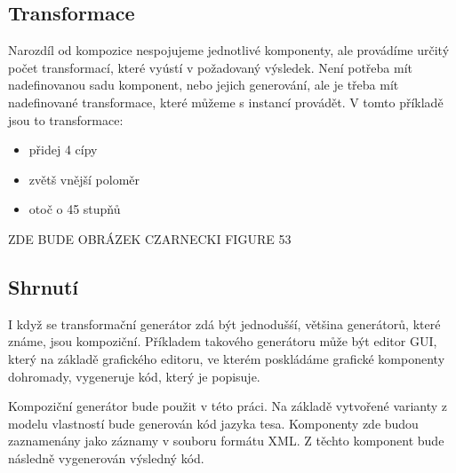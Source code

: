 \subsection{Transformace}
Narozdíl od kompozice nespojujeme jednotlivé komponenty, ale provádíme určitý počet transformací, které vyústí v požadovaný výsledek. Není potřeba mít nadefinovanou sadu komponent, nebo jejich generování, ale je třeba mít nadefinované transformace, které můžeme s instancí provádět. V tomto příkladě jsou to transformace: 
\begin{itemize}
	\item přidej 4 cípy
	\item zvětš vnější poloměr
	\item otoč o 45 stupňů
\end{itemize}
ZDE BUDE OBRÁZEK CZARNECKI FIGURE 53

\subsection{Shrnutí}
I když se transformační generátor zdá být jednodušśí, většina generátorů, které známe, jsou kompoziční. Příkladem takového generátoru může být editor GUI, který na základě grafického editoru, ve kterém poskládáme grafické komponenty dohromady, vygeneruje kód, který je popisuje.

Kompoziční generátor bude použit v této práci. Na základě vytvořené varianty z modelu vlastností bude generován kód jazyka tesa. Komponenty zde budou zaznamenány jako záznamy v souboru formátu XML. Z těchto komponent bude následně vygenerován výsledný kód.


